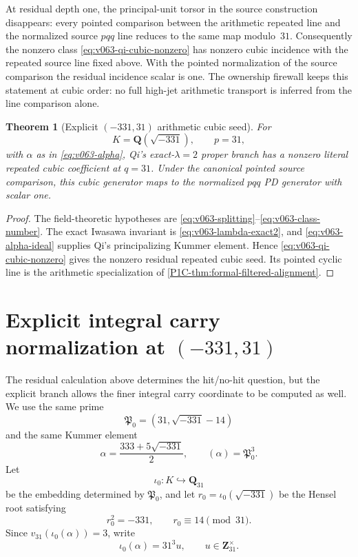 \documentclass[11pt]{article}
\newtheorem{theorem}{Theorem}[section]
\theoremstyle{remark}
\begin{document}
At residual depth one, the principal-unit torsor in the source construction disappears:
every pointed comparison between the arithmetic repeated line and the
 normalized source \(pqq\) line reduces to the same map modulo~\(31\).
Consequently the nonzero class
\eqref{eq:v063-qi-cubic-nonzero} has nonzero cubic incidence with the
repeated source line fixed above.  With the pointed normalization of
 the source comparison the residual incidence scalar is one.  The ownership firewall keeps this
statement at cubic order: no full high-jet arithmetic transport is inferred
from the line comparison alone.
\begin{theorem}[Explicit \((-331,31)\) arithmetic cubic seed]
\label{thm:v063-explicit-arithmetic-cubic}
For
\[
 K=\mathbf Q(\sqrt{-331}),\qquad p=31,
\]
with \(\alpha\) as in \eqref{eq:v063-alpha}, Qi's exact-\(\lambda=2\)
proper branch has a nonzero literal repeated cubic coefficient at \(q=31\).
Under the canonical pointed source comparison, this cubic generator
maps to the normalized \(pqq\) PD generator with scalar one.
\end{theorem}

\begin{proof}
The field-theoretic hypotheses are
\eqref{eq:v063-splitting}--\eqref{eq:v063-class-number}.  The exact Iwasawa
invariant is \eqref{eq:v063-lambda-exact2}, and
\eqref{eq:v063-alpha-ideal} supplies Qi's principalizing Kummer element.
Hence \eqref{eq:v063-qi-cubic-nonzero} gives the nonzero residual repeated
cubic seed.  Its pointed cyclic line is the arithmetic specialization of
\cref{P1C-thm:formal-filtered-alignment}.
\end{proof}

\section{Explicit integral carry normalization at \texorpdfstring{$(-331,31)$}{(-331,31)}}
\label{sec:v064-carry-normalization}

The residual calculation above determines the hit/no-hit question, but the
explicit branch allows the finer integral carry coordinate to be computed as
well.  We use the same prime
\[
 \mathfrak P_0=(31,\sqrt{-331}-14)
\]
and the same Kummer element
\[
 \alpha=\frac{333+5\sqrt{-331}}2,
 \qquad
 (\alpha)=\mathfrak P_0^3.
\]
Let
\[
 \iota_0:K\hookrightarrow\mathbf Q_{31}
\]
be the embedding determined by \(\mathfrak P_0\), and let
\(r_0=\iota_0(\sqrt{-331})\) be the Hensel root satisfying
\[
 r_0^2=-331,
 \qquad
 r_0\equiv14\pmod{31}.
\]
Since \(v_{31}(\iota_0(\alpha))=3\), write
\begin{equation}
 \boxed{
 \iota_0(\alpha)=31^3u,
 \qquad
 u\in\mathbf Z_{31}^{\times}.}
 \label{eq:v064-alpha-unit}
\end{equation}
\end{document}
